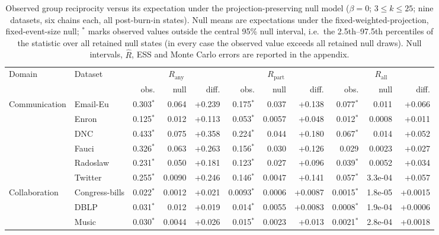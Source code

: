 \begin{table}[t]
\centering
\caption{Observed group reciprocity versus its expectation under the projection-preserving null model ($\beta=0$; $3\le k\le 25$; nine datasets, six chains each, all post-burn-in states). Null means are expectations under the fixed-weighted-projection, fixed-event-size null; $^{*}$ marks observed values outside the central 95\% null interval, i.e.\ the 2.5th--97.5th percentiles of the statistic over all retained null states (in every case the observed value exceeds all retained null draws). Null intervals, $\widehat R$, ESS and Monte Carlo errors are reported in the appendix.}
\label{tab:null-main}
\small
\begin{tabular}{llrrrrrrrrr}
\toprule
Domain & Dataset & \multicolumn{3}{c}{$R_{\mathrm{any}}$} & \multicolumn{3}{c}{$R_{\mathrm{part}}$} & \multicolumn{3}{c}{$R_{\mathrm{all}}$} \\
 & & obs. & null & diff. & obs. & null & diff. & obs. & null & diff. \\
\midrule
Communication & Email-Eu & 0.303$^{*}$ & 0.064 & +0.239 & 0.175$^{*}$ & 0.037 & +0.138 & 0.077$^{*}$ & 0.011 & +0.066 \\
 & Enron & 0.125$^{*}$ & 0.012 & +0.113 & 0.053$^{*}$ & 0.0057 & +0.048 & 0.012$^{*}$ & 0.0008 & +0.011 \\
 & DNC & 0.433$^{*}$ & 0.075 & +0.358 & 0.224$^{*}$ & 0.044 & +0.180 & 0.067$^{*}$ & 0.014 & +0.052 \\
 & Fauci & 0.326$^{*}$ & 0.063 & +0.263 & 0.156$^{*}$ & 0.030 & +0.126 & 0.029 & 0.0023 & +0.027 \\
 & Radoslaw & 0.231$^{*}$ & 0.050 & +0.181 & 0.123$^{*}$ & 0.027 & +0.096 & 0.039$^{*}$ & 0.0052 & +0.034 \\
 & Twitter & 0.255$^{*}$ & 0.0090 & +0.246 & 0.146$^{*}$ & 0.0047 & +0.141 & 0.057$^{*}$ & 3.3e-04 & +0.057 \\
\midrule
Collaboration & Congress-bills & 0.022$^{*}$ & 0.0012 & +0.021 & 0.0093$^{*}$ & 0.0006 & +0.0087 & 0.0015$^{*}$ & 1.8e-05 & +0.0015 \\
 & DBLP & 0.031$^{*}$ & 0.012 & +0.019 & 0.014$^{*}$ & 0.0055 & +0.0083 & 0.0008$^{*}$ & 1.9e-04 & +0.0006 \\
 & Music & 0.030$^{*}$ & 0.0044 & +0.026 & 0.015$^{*}$ & 0.0023 & +0.013 & 0.0021$^{*}$ & 2.8e-04 & +0.0018 \\
\bottomrule
\end{tabular}
\end{table}
